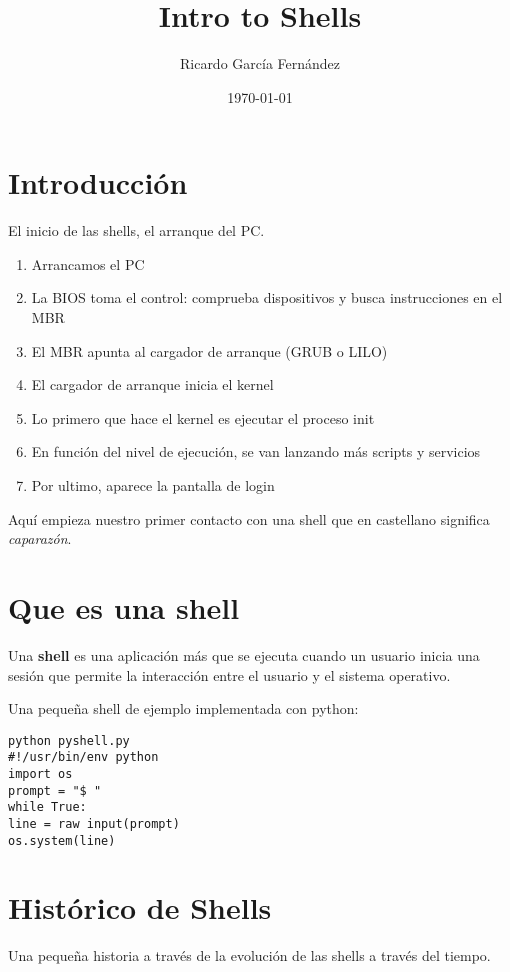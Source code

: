 \documentclass{scrartcl}
\title{\textbf{Intro to Shells}}
\author{Ricardo Garc\'ia Fern\'andez}
\date{\today}
\begin{document}
\maketitle

\section{Introducci\'on}

El inicio de las shells, el arranque del PC.

\begin{enumerate}
	\item Arrancamos el PC
	\item La BIOS toma el control: comprueba dispositivos y busca instrucciones en el MBR
	\item El MBR apunta al cargador de arranque (GRUB o LILO)
	\item El cargador de arranque inicia el kernel
	\item Lo primero que hace el kernel es ejecutar el proceso init
	\item En funci\'on del nivel de ejecuci\'on, se van lanzando m\'as scripts y servicios
	\item Por ultimo, aparece la pantalla de login
\end{enumerate}

Aqu\'i empieza nuestro primer contacto con una shell que en castellano significa \emph{caparaz\'on}.

\section{Que es una shell}

Una \textbf{shell} es una aplicaci\'on m\'as que se ejecuta cuando un usuario inicia una sesi\'on que permite la interacci\'on entre el usuario y el sistema operativo.

Una peque\~na shell de ejemplo implementada con python:

\begin{lstlisting}[style=Shell]
python pyshell.py
#!/usr/bin/env python
import os
prompt = "$ "
while True:
line = raw input(prompt)
os.system(line)
\end{lstlisting}

\section{Hist\'orico de Shells}

Una peque\~na historia a trav\'es de la evoluci\'on de las shells a trav\'es del tiempo.
\end{document}
